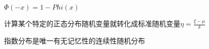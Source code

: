 \documentclass[12pt, a4paper, oneside]{ctexart}
\begin{document}
$\Phi(-x)=1-Phi(x)$

计算某个特定的正态分布随机变量就转化成标准随机变量$\eta = \frac{\xi-\mu}{\delta}$

指数分布是唯一有无记忆性的连续性随机分布








% 
% 
\end{document}
